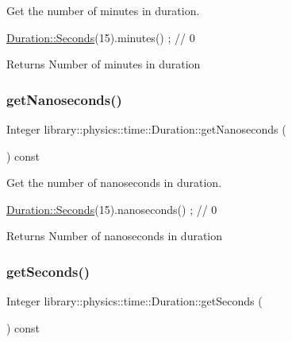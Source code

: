 Get the number of minutes in duration. 


\begin{DoxyCode}
\hyperlink{classlibrary_1_1physics_1_1time_1_1_duration_ae10891c94a1b2278c444cb44b37132f1}{Duration::Seconds}(15).minutes() ; \textcolor{comment}{// 0}
\end{DoxyCode}


\begin{DoxyReturn}{Returns}
Number of minutes in duration 
\end{DoxyReturn}
\mbox{\label{classlibrary_1_1physics_1_1time_1_1_duration_a5dad1e24c78cd7ef13a4220eb4e73dd0}} 
\subsubsection{\texorpdfstring{get\+Nanoseconds()}{getNanoseconds()}}
{\footnotesize\ttfamily Integer library\+::physics\+::time\+::\+Duration\+::get\+Nanoseconds (\begin{DoxyParamCaption}{ }\end{DoxyParamCaption}) const}



Get the number of nanoseconds in duration. 


\begin{DoxyCode}
\hyperlink{classlibrary_1_1physics_1_1time_1_1_duration_ae10891c94a1b2278c444cb44b37132f1}{Duration::Seconds}(15).nanoseconds() ; \textcolor{comment}{// 0}
\end{DoxyCode}


\begin{DoxyReturn}{Returns}
Number of nanoseconds in duration 
\end{DoxyReturn}
\mbox{\label{classlibrary_1_1physics_1_1time_1_1_duration_a98388bab81d1d5550532fdedaa08635c}} 
\subsubsection{\texorpdfstring{get\+Seconds()}{getSeconds()}}
{\footnotesize\ttfamily Integer library\+::physics\+::time\+::\+Duration\+::get\+Seconds (\begin{DoxyParamCaption}{ }\end{DoxyParamCaption}) const}



